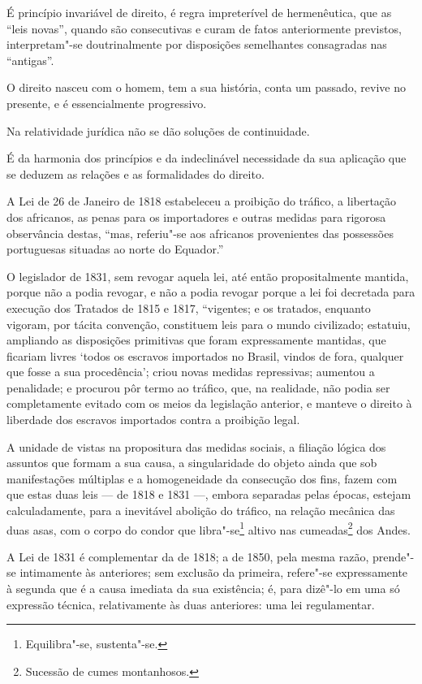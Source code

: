 É princípio invariável de direito, é regra impreterível de hermenêutica,
que as ``leis novas'', quando são consecutivas e curam de fatos
anteriormente previstos, interpretam"-se doutrinalmente por disposições
semelhantes consagradas nas ``antigas''.

O direito nasceu com o homem, tem a sua história, conta um passado,
revive no presente, e é essencialmente progressivo.

Na relatividade jurídica não se dão soluções de continuidade.

É da harmonia dos princípios e da indeclinável necessidade da sua
aplicação que se deduzem as relações e as formalidades do direito.

A Lei de 26 de Janeiro de 1818 estabeleceu a proibição do tráfico, a
libertação dos africanos, as penas para os importadores e outras medidas
para rigorosa observância destas, ``mas, referiu"-se aos africanos
provenientes das possessões portuguesas situadas ao norte do Equador.''

O legislador de 1831, sem revogar aquela lei, até então propositalmente
mantida, porque não a podia revogar, e não a podia revogar porque a lei
foi decretada para execução dos Tratados de 1815 e 1817, ``vigentes; e os
tratados, enquanto vigoram, por tácita convenção, constituem leis para o
mundo civilizado; estatuiu, ampliando as disposições primitivas que
foram expressamente mantidas, que ficariam livres `todos os escravos
importados no Brasil, vindos de fora, qualquer que fosse a sua
procedência'; criou novas medidas repressivas; aumentou a penalidade; e
procurou pôr termo ao tráfico, que, na realidade, não podia ser
completamente evitado com os meios da legislação anterior, e manteve o
direito à liberdade dos escravos importados contra a proibição legal.

A unidade de vistas na propositura das medidas sociais, a filiação
lógica dos assuntos que formam a sua causa, a singularidade do objeto
ainda que sob manifestações múltiplas e a homogeneidade da consecução
dos fins, fazem com que estas duas leis --- de 1818 e 1831 ---, embora
separadas pelas épocas, estejam calculadamente, para a inevitável
abolição do tráfico, na relação mecânica das duas asas, com o corpo do
condor que libra"-se\footnote{Equilibra"-se, sustenta"-se.} altivo nas
cumeadas\footnote{Sucessão de cumes montanhosos.} dos Andes.

A Lei de 1831 é complementar da de 1818; a de 1850, pela mesma razão,
prende"-se intimamente às anteriores; sem exclusão da primeira, refere"-se
expressamente à segunda que é a causa imediata da sua existência; é,
para dizê"-lo em uma só expressão técnica, relativamente às duas
anteriores: uma lei regulamentar.


